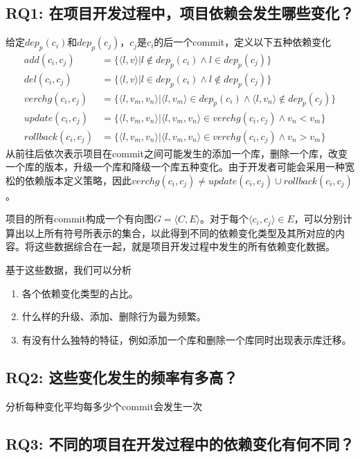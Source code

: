 \documentclass[UTF8]{ctexart}
\begin{document}
\subsection{RQ1: 在项目开发过程中，项目依赖会发生哪些变化？}

给定$dep_p(c_i)$和$dep_p(c_j)$，$c_j$是$c_i$的后一个commit，定义以下五种依赖变化
\begin{align}
add(c_i, c_j) &= \{\langle l, v \rangle |l \notin dep_p(c_i) \wedge l \in dep_p(c_j)\} \\
del(c_i, c_j) &= \{\langle l, v \rangle |l \in dep_p(c_i) \wedge l \notin dep_p(c_j)\} \\
verchg(c_i, c_j) &= \{\langle l, v_m, v_n \rangle | \langle l, v_m \rangle \in dep_p(c_i) \wedge \langle l, v_n \rangle \notin dep_p(c_j)\}\\
update(c_i, c_j) &= \{\langle l, v_m, v_n \rangle | \langle l, v_m, v_n \rangle \in verchg(c_i, c_j) \wedge v_n < v_m \} \\
rollback(c_i, c_j) &= \{\langle l, v_m, v_n \rangle | \langle l, v_m, v_n \rangle \in verchg(c_i, c_j) \wedge v_n > v_m \}
\end{align}
从前往后依次表示项目在commit之间可能发生的添加一个库，删除一个库，改变一个库的版本，升级一个库和降级一个库五种变化。由于开发者可能会采用一种宽松的依赖版本定义策略\cite{2019MSR-Dietrich-DependencyVersioning}，因此$verchg(c_i, c_j) \neq update(c_i, c_j) \cup rollback(c_i, c_j)$。

项目的所有commit构成一个有向图$G=\langle C, E \rangle$。对于每个$\langle c_i, c_j \rangle \in E$，可以分别计算出以上所有符号所表示的集合，以此得到不同的依赖变化类型及其所对应的内容。将这些数据综合在一起，就是项目开发过程中发生的所有依赖变化数据。

基于这些数据，我们可以分析
\begin{enumerate}
	\item 各个依赖变化类型的占比。
	\item 什么样的升级、添加、删除行为最为频繁。
	\item 有没有什么独特的特征，例如添加一个库和删除一个库同时出现表示库迁移。
\end{enumerate}

\subsection{RQ2: 这些变化发生的频率有多高？}

分析每种变化平均每多少个commit会发生一次

\subsection{RQ3: 不同的项目在开发过程中的依赖变化有何不同？}
\end{document}
